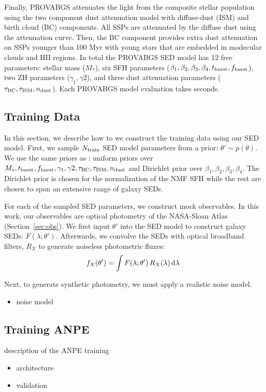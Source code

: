 Finally, PROVABGS attenuates the light from the composite stellar population
using the two component \cite{charlot2000} dust attenuation model with
diffuse-dust (ISM) and birth cloud (BC) components. 
All SSPs are attenuated by the diffuse dust using the \cite{kriek2013}
attenuation curve.
Then, the BC component provides extra dust attenuation on SSPs younger than 100
Myr with young stars that are embedded in modecular clouds and HII regions. 
In total the PROVABGS SED model has 12 free parameters: stellar mass ($M_*$),
six SFH parameters ($\beta_1, \beta_2, \beta_3, \beta_4, t_{\rm burst}, f_{\rm
burst}$), two ZH parameters ($\gamma_1, \gamma2$), and three dust attenuation
parameters ($\tau_{\rm BC}, \tau_{\rm ISM}, n_{\rm dust}$). 
Each PROVABGS model evaluation takes  seconds. 

\subsection{Training Data} \label{sec:training}
In this section, we describe how to we construct the training data using our
SED model.
First, we sample $N_{\rm train}$ SED model parameters from a prior: $\theta'\sim p(\theta)$. 
We use the same priors as : uniform priors over $M_*,
t_{\rm burst}, f_{\rm burst}, \gamma_1, \gamma2, \tau_{\rm BC}, \tau_{\rm ISM},
n_{\rm dust}$ and Dirichlet prior over $\beta_1, \beta_2, \beta_3, \beta_4$. 
The Dirichlet prior is chosen for the normalization of the NMF SFH while the
rest are chosen to span an extensive range of galaxy SEDs. 

For each of the sampled SED parameters, we construct mock observables. 
In this work, our observables are optical photometry of the NASA-Sloan Atlas
(Section~\ref{sec:obs}).
We first input $\theta'$ into the SED model to construct galaxy SEDs: 
$F(\lambda;\theta')$. 
Afterwards, we convolve the SEDs with optical broadband filters, $R_X$ to
generate noiseless photometric fluxes:
\begin{equation}
    f_X(\theta') = \int F(\lambda;\theta') \, R_X(\lambda) \, {\rm d}\lambda
\end{equation}

Next, to generate synthetic photometry, we must apply a realistic noise model.


\begin{itemize}
    \item noise model 
\end{itemize}

\subsection{Training ANPE} \label{sec:anpe}
description of the ANPE training
\begin{itemize}
    \item architecture
    \item validation 
\end{itemize}

